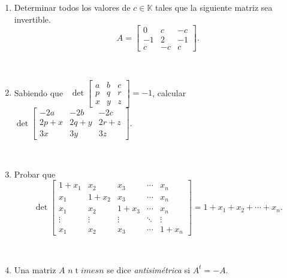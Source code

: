 \documentclass[12pt]{amsart}
\begin{document}
\begin{enumerate}[resume]
\item Determinar todos los valores de $c\in\mathbb{K}$ tales que la siguiente matriz sea invertible.
$$A=\begin{bmatrix} 0&c&-c\\ -1&2&-1\\c&-c&c\end{bmatrix}.$$

%		

\

\item Sabiendo que \
$
\det \begin{bmatrix} a&b&c\\ p&q&r\\
x&y&z\end{bmatrix}=-1
$,
calcular \
$
\det \begin{bmatrix} -2a&-2b&-2c\\ 2p+x&2q+y&2r+z\\
3x&3y&3z\end{bmatrix}.
$

\

\item Probar que
$$
\det\begin{bmatrix}
1+x_1 & x_2 & x_3 & \cdots & x_n \\
x_1 & 1+x_2 & x_3 & \cdots & x_n \\
x_1 & x_2 & 1+x_3 & \cdots & x_n \\
\vdots & \vdots & \vdots &\ddots& \vdots \\
x_1 & x_2 & x_3 & \cdots & 1+x_n
\end{bmatrix}
= 1+x_1+x_2 + \cdots + x_n.
$$

\

\item
Una matriz $A$ $n {\operatorname t}imes n$ se dice {\it antisim\'etrica}
si $A^t=-A$.


\end{enumerate}
\end{document}
